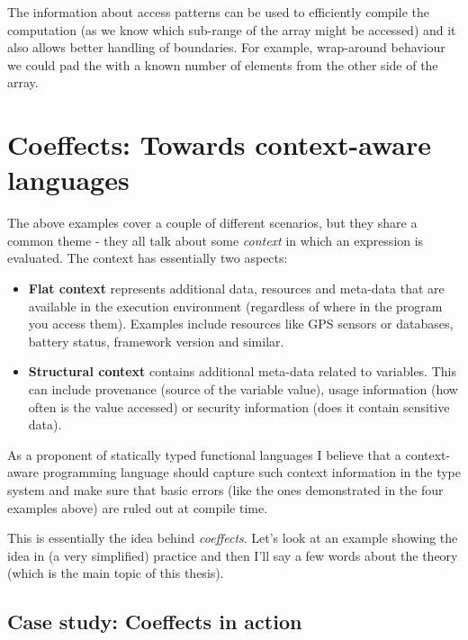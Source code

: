 The information about access patterns can be used to efficiently compile the computation
(as we know which sub-range of the array might be accessed) and it also allows better handling
of boundaries. For example, wrap-around behaviour we could pad the  with a known
number of elements from the other side of the array.


\section{Coeffects: Towards context-aware languages}

The above examples cover a couple of different scenarios, but they share a common theme - 
they all talk about some \emph{context} in which an expression is evaluated. The context has 
essentially two aspects:

\begin{itemize}
\item \textbf{Flat context} represents additional data, resources and meta-data that are 
   available in the execution environment (regardless of where in the program you 
   access them). Examples include resources like GPS sensors or databases, battery status,
   framework version and similar. 

\item \textbf{Structural context} contains additional meta-data related to variables. This can include
   provenance (source of the variable value), usage information (how often is the value
   accessed) or security information (does it contain sensitive data). 
\end{itemize}

As a proponent of statically typed functional languages I believe that a context-aware 
programming language should capture such context information in the type system and make
sure that basic errors (like the ones demonstrated in the four examples above) are ruled
out at compile time.  

This is essentially the idea behind \emph{coeffects}. Let's look at an example showing the
idea in (a very simplified) practice and then I'll say a few words about the theory
(which is the main topic of this thesis).


\subsection{Case study: Coeffects in action}

